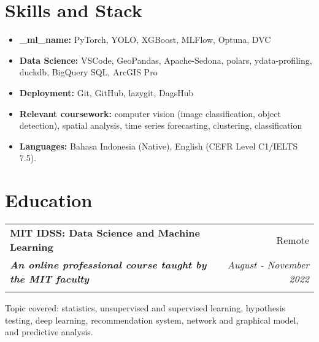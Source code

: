 \documentclass[a4paper, 11pt]{article}
\makeatletter
\newcommand{\resumeItem}[2]{
    \item\small{
        \textbf{#1}{#2 \vspace{-2pt}}
    }
}
\newcommand{\resumeSubheading}[4]{
    \vspace{-1pt}
    \begin{tabular*}{\textwidth}{l@{\extracolsep{\fill}}r}
        \color{lightblue}\textbf{#1} & #2 \\
        \textbf{\textit{\small#3}} & \textit{\small #4} \\
        \textnormal{}\vspace{-5pt}
    \end{tabular*}\vspace{-5pt}
}
\newcommand{\resumeItemListStart}{\begin{itemize}[leftmargin=*]\setlength\itemsep{0em}\vspace{-1pt}}
\newcommand{\resumeItemListEnd}{\end{itemize}\vspace{-5pt}}
\makeatother
\begin{document}

    \vspace{20pt}
    \section{Skills and Stack}
    \resumeItemListStart
    \resumeItem{\sk_ml_name:}{
        PyTorch, YOLO, XGBoost, MLFlow, Optuna, DVC
    }
    \resumeItem{Data Science:}{
        VSCode, GeoPandas, Apache-Sedona, polars, ydata-profiling, duckdb, BigQuery SQL, ArcGIS Pro
    }
    \resumeItem{Deployment:}{
        Git, GitHub, lazygit, DagsHub
    }
    \resumeItem{Relevant coursework:}{
        computer vision (image classification, object detection),
        spatial analysis,
        time series forecasting,
        clustering,
        classification
    }
    \resumeItem{Languages:}{
        Bahasa Indonesia (Native), 
        English (CEFR Level C1/IELTS 7.5).
    }
    \resumeItemListEnd

    \vspace{-10pt}
    \section{Education}

    \resumeSubheading
    {MIT IDSS: Data Science and Machine Learning}
    {Remote}
    {An online professional course taught by the MIT faculty}
    {August - November 2022}
    \small{Topic covered: statistics, unsupervised and supervised learning, hypothesis testing, 
    deep learning, recommendation system, network and graphical model, and predictive 
    analysis.}
    
\end{document}
